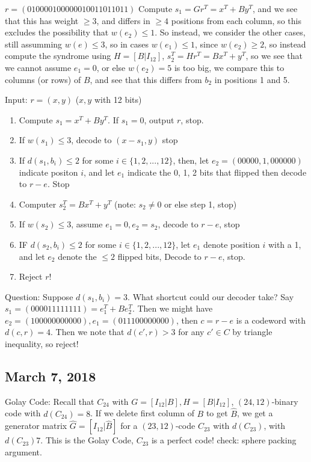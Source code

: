\documentclass{article}
\begin{document}
$r = (0100 0010 0000 0100 1101 1011)$
Compute $s_1 = Gr^T = x^T + By^T$, and we see that this has weight
$\geq 3$, and differs in $\geq 4$ positions from each column, so
this excludes the possibility that $w(e_2) \leq 1$. So instead, we
consider the other cases, still assumming $w(e) \leq 3$, so in
cases $w(e_1)\leq 1$, since $w(e_2)\geq 2$, so instead compute the
syndrome using $H = [B|I_{12}]$,
$s_2^T = Hr^T = Bx^T + y^T$, so we see that we cannot assume $e_1 = 0$,
or else $w(e_2) = 5$ is too big, we compare this to columns (or rows) of
$B$, and see that this differs from $b_2$ in positions 1 and 5.


Input: $r = (x,y)$ ($x,y$ with 12 bits)
\begin{enumerate}
    \item Compute $s_1 = x^T + By^T$. If $s_1 = 0$, output $r$, stop.
    \item If $w(s_1) \leq 3$, decode to $(x-s_1, y)$ stop
    \item If $d(s_1, b_i)\leq 2$ for some $i\in\{1,2,...,12\}$, then,
        let $e_2 = (00000,1,000000)$ indicate positon $i$, and let
        $e_1$ indicate the 0, 1, 2 bits that flipped then decode to $r-e$.
        Stop
    \item Computer $s_2^T = Bx^T + y^T$ (note: $s_2 \ne 0$ or else step 1, stop)
    \item If $w(s_2)\leq 3$, assume $e_1 = 0, e_2 = s_2$, decode to $r-e$, stop
    \item IF $d(s_2, b_i) \leq 2$ for some $i\in\{1,2,...,12\}$, let $e_1$ denote
        position $i$ with a 1, and let $e_2$ denote the $\leq 2$ flipped bits,
        Decode to $r-e$, stop.
    \item Reject $r$!
\end{enumerate}

Question: Suppose $d(s_1, b_i) = 3$. What shortcut could our decoder take?
Say $s_1 = (0000 1111 1111) = e^T_1 + Be_2^T$. Then we might have
$e_2 = (1000 0000 0000), e_1 = (0111 0000 0000)$, then $c=r-e$ is a codeword
with $d(c,r) = 4$. Then we note that $d(c', r) > 3$ for any $c'\in C$ by triangle
inequality, so reject!

\subsection{March 7, 2018}
Golay Code: Recall that $C_{24}$ with $G = [I_{12}| B], H = [B|I_{12}]$,
$(24, 12)$-binary code with $d(C_{24}) = 8$. If we delete first column of $B$ to
get $\hat{B}$, we get a generator matrix $\hat{G} = [I_{12}|\hat{B}]$ for a
$(23, 12)$-code $C_{23}$ with $d(C_{23})$, with $d(C_{23}) 7$. This is the
Golay Code, $C_{23}$ is a perfect code!
check: sphere packing argument.
\end{document}

